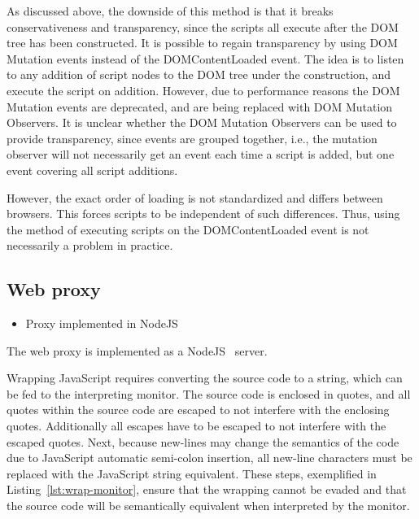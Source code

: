 \documentclass{llncs}
\begin{document}
As discussed above, the downside of this method is that it breaks
conservativeness and transparency, since the scripts all execute after the DOM
tree has been constructed. It is possible to regain transparency by using DOM
Mutation events instead of the DOMContentLoaded event.  The idea is to listen
to any addition of script nodes to the DOM tree under the construction, and
execute the script on addition.  However, due to performance reasons the DOM
Mutation events are deprecated, and are being replaced with DOM Mutation
Observers. It is unclear whether the DOM Mutation Observers can be used to
provide transparency, since events are grouped together, i.e., the mutation
observer will not necessarily get an event each time a script is added, but one
event covering all script additions.

However, the exact order of loading is not standardized and differs between
browsers. This forces scripts to be independent of such differences. Thus,
using the method of executing scripts on the DOMContentLoaded event is not
necessarily a problem in practice. 


\subsection{Web proxy}

\begin{itemize}
\item Proxy implemented in NodeJS
\end{itemize}

The web proxy is implemented as a NodeJS~\cite{NodeJS} server. 

Wrapping JavaScript requires converting the source code to a string, which can 
be fed to the interpreting monitor. The source code is enclosed in quotes, and all 
quotes within the source code are escaped to not interfere with the enclosing quotes.
Additionally all escapes have to be escaped to not interfere with the escaped 
quotes. Next, because new-lines may change the semantics of the code due to 
JavaScript automatic semi-colon insertion, all new-line 
characters must be replaced with the JavaScript string equivalent.
These steps, exemplified in Listing~\ref{lst:wrap-monitor}, ensure that the wrapping cannot be evaded and that the source code 
will be semantically equivalent when interpreted by the monitor.
\end{document}
